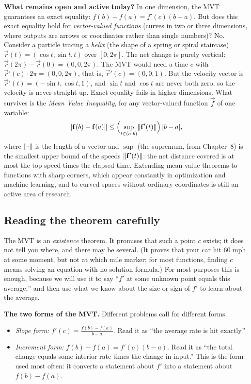\begin{historybox}
\textbf{What remains open and active today?} In one dimension, the MVT guarantees an
exact equality: $f(b)-f(a)=f'(c)(b-a)$. But does this exact equality hold for
\emph{vector-valued functions} (curves in two or three dimensions, where outputs are
arrows or coordinates rather than single numbers)? No. Consider a particle
tracing a \emph{helix} (the shape of a spring or spiral staircase)
$\vec{r}(t)=(\cos t, \sin t, t)$ over $[0,2\pi]$. The net
change is purely vertical: $\vec{r}(2\pi)-\vec{r}(0)=(0,0,2\pi)$. The MVT would
need a time $c$ with $\vec{r}'(c)\cdot 2\pi=(0,0,2\pi)$, that is,
$\vec{r}'(c)=(0,0,1)$. But the velocity vector is
$\vec{r}'(t)=(-\sin t, \cos t, 1)$, and $\sin t$ and $\cos t$ are never both zero, so
the velocity is never straight up. Exact equality fails in higher dimensions. What
survives is the \emph{Mean Value Inequality}, for any vector-valued function
$\vec{f}$ of one variable:
\[
  \lVert\mathbf{f}(b)-\mathbf{f}(a)\rVert\le \Bigl(\sup_{t\in(a,b)} \lVert\mathbf{f}'(t)\rVert\Bigr)\,\lvert b-a\rvert,
\]
where $\lVert\cdot\rVert$ is the length of a vector and $\sup$ (the supremum, from
Chapter~8) is the smallest upper bound of the speeds $\lVert\mathbf{f}'(t)\rVert$: the net
distance covered is at most the top speed times the elapsed time. Extending mean
value theorems to functions with sharp corners, which appear constantly in
optimization and machine learning, and to curved spaces without ordinary coordinates
is still an active area of research.
\end{historybox}

\subsection{Reading the theorem carefully}

The MVT is an \emph{existence} theorem. It promises that such a point $c$ exists; it
does not tell you where, and there may be several. (It proves that your car hit
$60$ mph at some moment, but not at which mile marker; for most functions, finding $c$
means solving an equation with no solution formula.) For most purposes this is
enough, because we will use it to say ``$f'$ at some unknown point equals
this average,'' and then use what we know about the size or sign of $f'$ to learn
about the average.

\begin{focusbox}
\textbf{The two forms of the MVT.} Different problems call for different forms.
\begin{itemize}
\item \emph{Slope form:} $\displaystyle f'(c)=\frac{f(b)-f(a)}{b-a}$. Read it as
``the average rate is hit exactly.''
\item \emph{Increment form:} $f(b)-f(a)=f'(c)(b-a)$. Read it as ``the total change
equals some interior rate times the change in input.'' This is the form used most
often: it converts a statement about $f'$ into a statement about $f(b)-f(a)$.
\end{itemize}
\end{focusbox}

